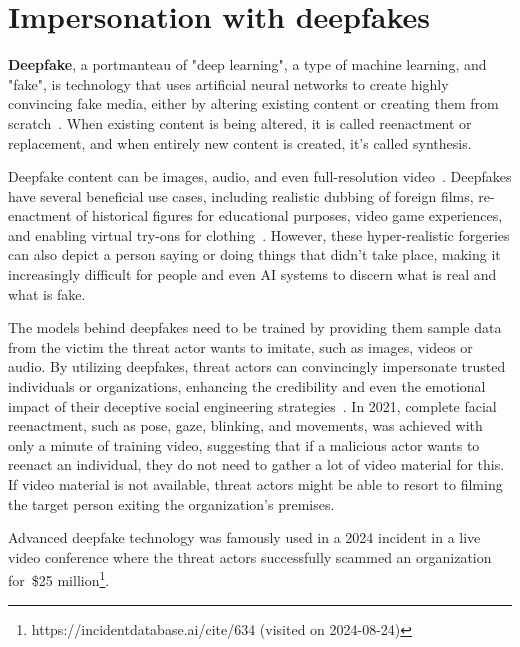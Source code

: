 \section{Impersonation with deepfakes}
\begin{comment}
\end{comment}

%
%
\textbf{Deepfake}, a portmanteau of "deep learning", a type of machine learning, and "fake", is technology that uses artificial neural networks to create highly convincing fake media, either by altering existing content or creating them from scratch~\citep{mirsky_Creation_Detection_Deepfakes_2021}. When existing content is being altered, it is called reenactment or replacement, and when entirely new content is created, it's called synthesis.

%
%
Deepfake content can be images, audio, and even full-resolution video~\citep{blauth_AI_Crime_Overview_Malicious_Use_Abuse_2022}. Deepfakes have several beneficial use cases, including realistic dubbing of foreign films, re-enactment of historical figures for educational purposes, video game experiences, and enabling virtual try-ons for clothing~\citep{mirsky_Creation_Detection_Deepfakes_2021}. However, these hyper-realistic forgeries can also depict a person saying or doing things that didn't take place, making it increasingly difficult for people and even AI systems to discern what is real and what is fake. 

%
%
The models behind deepfakes need to be trained by providing them sample data from the victim the threat actor wants to imitate, such as images, videos or audio. By utilizing deepfakes, threat actors can convincingly impersonate trusted individuals or organizations, enhancing the credibility and even the emotional impact of their deceptive social engineering strategies~\citep{mirsky_Creation_Detection_Deepfakes_2021}. In 2021, complete facial reenactment, such as pose, gaze, blinking, and movements, was achieved with only a minute of training video, suggesting that if a malicious actor wants to reenact an individual, they do not need to gather a lot of video material for this. If video material is not available, threat actors might be able to resort to filming the target person exiting the organization's premises. 


Advanced deepfake technology was famously used in a 2024 incident in a live video conference where the threat actors successfully scammed an organization for~\$25 million\footnote{https://incidentdatabase.ai/cite/634 (visited on 2024-08-24)}.%




